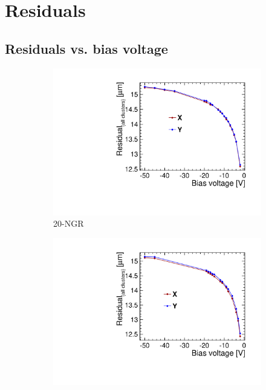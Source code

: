 \section{Residuals}
\subsection{Residuals vs. bias voltage}
\begin{figure}[htbp] \centering
  \begin{subfigure}[b]{0.33\textwidth}
    \includegraphics[width=\textwidth]{./figures/TestBeam/W19_G7_Residual_vs_bias.pdf}
    \caption{20-NGR}
  \end{subfigure} \hfill
  \begin{subfigure}[b]{0.33\textwidth}
    \includegraphics[width=\textwidth]{./figures/TestBeam/W19_F7_Residual_vs_bias.pdf}

\end{subfigure}
\end{figure}
